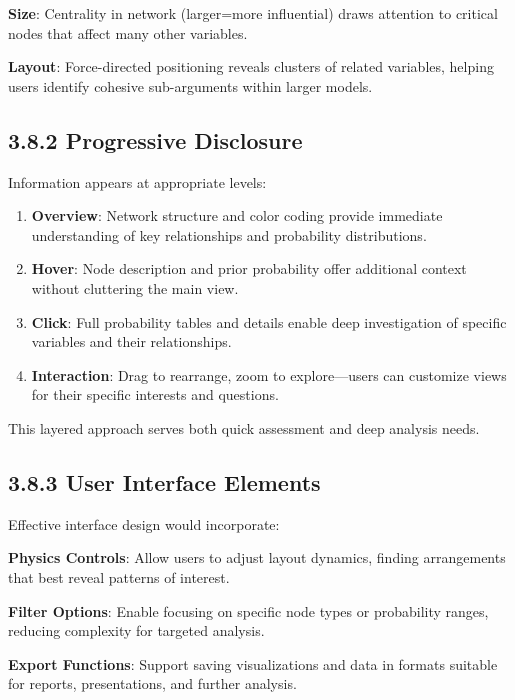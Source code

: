 \documentclass[
  11pt,
  letterpaper,
]{book}
\providecommand{\tightlist}{%
  \setlength{\itemsep}{0pt}\setlength{\parskip}{0pt}}
\begin{document}
\textbf{Size}: Centrality in network (larger=more influential) draws
attention to critical nodes that affect many other variables.

\textbf{Layout}: Force-directed positioning reveals clusters of related
variables, helping users identify cohesive sub-arguments within larger
models.

\subsection{3.8.2 Progressive
Disclosure}\label{sec-progressive-disclosure}

Information appears at appropriate levels:

\begin{enumerate}
\def\labelenumi{\arabic{enumi}.}
\tightlist
\item
  \textbf{Overview}: Network structure and color coding provide
  immediate understanding of key relationships and probability
  distributions.
\item
  \textbf{Hover}: Node description and prior probability offer
  additional context without cluttering the main view.
\item
  \textbf{Click}: Full probability tables and details enable deep
  investigation of specific variables and their relationships.
\item
  \textbf{Interaction}: Drag to rearrange, zoom to explore---users can
  customize views for their specific interests and questions.
\end{enumerate}

This layered approach serves both quick assessment and deep analysis
needs.

\subsection{3.8.3 User Interface Elements}\label{sec-ui-elements}

Effective interface design would incorporate:

\textbf{Physics Controls}: Allow users to adjust layout dynamics,
finding arrangements that best reveal patterns of interest.

\textbf{Filter Options}: Enable focusing on specific node types or
probability ranges, reducing complexity for targeted analysis.

\textbf{Export Functions}: Support saving visualizations and data in
formats suitable for reports, presentations, and further analysis.
\end{document}
